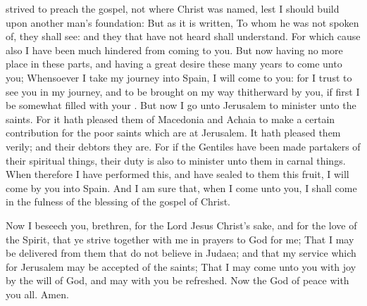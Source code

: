 {strived to preach the
gospel,
not
where
Christ was
named,
lest I should
build
upon another
man’s
foundation:
But
as it is
written, To
whom
he
was
not
spoken
of, they shall
see:
and they that
have
not
heard shall
understand.
For which
cause
also I have
been
much
hindered from
coming
to
you.
But
now
having no
more
place
in
these
parts,
and
having a great
desire
these
many
years to
come
unto
you;
Whensoever I take my
journey
into
Spain, I will
come
to
you:
for I
trust to
see
you in my
journey,
and to be brought on my
way
thitherward
by
you,
if
first I
be
somewhat filled
with
your
{}.
But
now I
go
unto
Jerusalem to
minister unto the
saints.
For it hath pleased
them of
Macedonia
and
Achaia to
make
a
certain
contribution
for the
poor
saints which
are
at
Jerusalem.
It hath pleased
them
verily;
and
their
debtors they
are.
For
if the
Gentiles have been made partakers
of
their spiritual
things, their duty
is
also to
minister unto
them
in carnal
things.
When
therefore I have
performed
this,
and have
sealed to
them
this
fruit, I will
come
by
you
into
Spain.
And I am
sure
that, when I
come
unto
you, I shall
come
in the
fulness of the
blessing of the
gospel of
Christ.
\par }{\PP {}Now I
beseech
you,
brethren, for
the
Lord
Jesus
Christ’s
sake,
and
for the
love of the
Spirit, that ye strive
together with
me
in
{}
prayers
to
God
for
me;
That I may be
delivered
from them that do not
believe
in
Judaea;
and
that
my
service
which
{}
for
Jerusalem may
be
accepted of the
saints;
That I may
come
unto
you
with
joy
by the
will of
God,
and may
with
you be
refreshed.
Now the
God of
peace
{}
with
you
all.
Amen.

}
